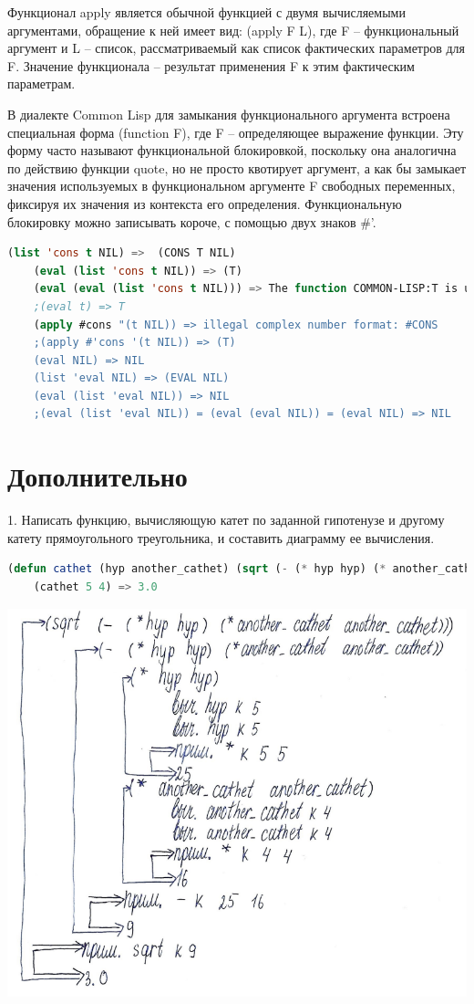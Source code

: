 \documentclass[12pt]{report}
\begin{document}
Функционал apply является обычной функцией с двумя  вычисляемыми аргументами, обращение к ней имеет вид: (apply F L), где F – функциональный аргумент и L – список, рассматриваемый как список фактических параметров для F. Значение функционала – результат применения F к этим фактическим параметрам.

В диалекте Common Lisp для замыкания функционального аргумента встроена специальная форма (function F), где F – определяющее  выражение функции. Эту форму часто называют функциональной  блокировкой, поскольку она аналогична по действию функции quote, но  не просто квотирует аргумент, а как бы замыкает значения используемых  в функциональном аргументе F свободных переменных, фиксируя их  значения из контекста его определения. Функциональную блокировку  можно записывать короче, с помощью двух знаков \#'.
 
\begin{lstlisting}[language=Lisp]
	(list 'cons t NIL) =>  (CONS T NIL)
	(eval (list 'cons t NIL)) => (T)
	(eval (eval (list 'cons t NIL))) => The function COMMON-LISP:T is undefined
	;(eval t) => T
	(apply #cons "(t NIL)) => illegal complex number format: #CONS
	;(apply #'cons '(t NIL)) => (T)
	(eval NIL) => NIL
	(list 'eval NIL) => (EVAL NIL) 
	(eval (list 'eval NIL)) => NIL
	;(eval (list 'eval NIL)) = (eval (eval NIL)) = (eval NIL) => NIL
\end{lstlisting}

\section*{Дополнительно}

1. Написать функцию, вычисляющую катет по заданной гипотенузе и другому катету  прямоугольного треугольника, и составить диаграмму ее вычисления.

\begin{lstlisting}[language=Lisp]
	(defun cathet (hyp another_cathet) (sqrt (- (* hyp hyp) (* another_cathet another_cathet))))
	(cathet 5 4) => 3.0
\end{lstlisting}

\includegraphics[scale=1.2]{img/d1}
\end{document}
